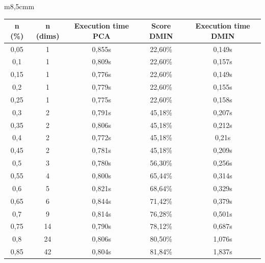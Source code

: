 \documentclass[12pt,a4paper]{article}
\begin{document}
{\begin{tabular}{m{}m{}}
    \sffamily\small\centering
    \begin{tabular}{|c|c|c|c|c|}
        \hline
        \tiny n (\%) & \tiny n (dims) & \tiny Execution time PCA & \tiny Score DMIN & \tiny Execution time DMIN \\
        \hline
        0,05         & 1              & 0,855s                   & 22,60\%          & 0,149s     \\
        0,1          & 1              & 0,809s                   & 22,60\%          & 0,157s     \\
        0,15         & 1              & 0,776s                   & 22,60\%          & 0,149s     \\
        0,2          & 1              & 0,779s                   & 22,60\%          & 0,155s     \\
        0,25         & 1              & 0,775s                   & 22,60\%          & 0,158s     \\
        0,3          & 2              & 0,791s                   & 45,18\%          & 0,207s     \\
        0,35         & 2              & 0,806s                   & 45,18\%          & 0,212s     \\
        0,4          & 2              & 0,772s                   & 45,18\%          & 0,21s      \\
        0,45         & 2              & 0,781s                   & 45,18\%          & 0,209s     \\
        0,5          & 3              & 0,780s                   & 56,30\%          & 0,256s     \\
        0,55         & 4              & 0,800s                   & 65,44\%          & 0,314s     \\
        0,6          & 5              & 0,821s                   & 68,64\%          & 0,329s     \\
        0,65         & 6              & 0,844s                   & 71,42\%          & 0,379s     \\
        0,7          & 9              & 0,814s                   & 76,28\%          & 0,501s     \\
        0,75         & 14             & 0,790s                   & 78,12\%          & 0,687s     \\
        0,8          & 24             & 0,806s                   & 80,50\%          & 1,076s     \\
        0,85         & 42             & 0,804s                   & 81,84\%          & 1,837s     \\

\end{tabular}
\end{tabular}}
\end{document}
